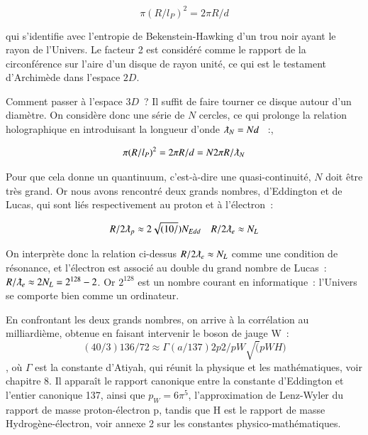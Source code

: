\documentclass[a4paper,12pt]{article}
\begin{document}
\begin{equation}
\pi(R/l_P)^2 = 2 \pi R/d 
\end{equation}


qui s'identifie avec l'entropie de Bekenstein-Hawking d'un trou noir ayant le rayon de l'Univers. Le facteur 2 est considéré comme le rapport de la circonférence sur l'aire d'un disque de rayon unité, ce qui est le testament d'Archimède dans l'espace $2D$.


      Comment passer à l'espace $3D$ ? Il suffit de faire tourner ce disque autour d'un diamètre. On considère donc une série de $N$ cercles, ce qui prolonge la relation holographique en introduisant la longueur d'onde $\lambdabar_N = N d$  :,


\begin{equation}
\pi (R/l_P)^2 = 2 \pi R/d  = N 2\pi R/\lambdabar_N 
\end{equation}


Pour que cela donne un quantinuum, c'est-à-dire une quasi-continuité, $ N$ doit être très grand. Or nous avons rencontré deux grands nombres, d'Eddington et de Lucas, qui sont liés respectivement au proton et à l'électron :


\begin{equation}
R/2\lambdabar_p \approx 2\sqrt{(10/})N_{Edd}     ~~~~   R/2\lambdabar_e \approx N_L 
\end{equation}



On interprète donc la relation ci-dessus $R/2\lambdabar_e \approx N_L$ comme une condition de résonance, et l'électron est associé au double du grand nombre de Lucas : $R/\lambdabar_e \approx 2 N_L = 2^{128}-2$. Or $2^{128}$ est un nombre courant en informatique : l'Univers se comporte bien comme un ordinateur.

En confrontant les deux grands nombres, on arrive à la corrélation au milliardième, obtenue en faisant intervenir le boson de jauge W : 
\begin{equation}
(40/3)136/72 \approx \Gamma(a/137)2 p2/pW\sqrt(pW H)
\end{equation}, où $\Gamma$ est  la constante d'Atiyah, qui réunit la physique et les mathématiques, voir chapitre 8. Il apparaît le rapport canonique entre la constante d'Eddington et l'entier canonique 137, ainsi que $p_W = 6\pi^5$, l'approximation de Lenz-Wyler du rapport de masse proton-électron p, tandis que H est le rapport de masse Hydrogène-électron, voir annexe 2 sur les constantes physico-mathématiques. 
\end{document}
